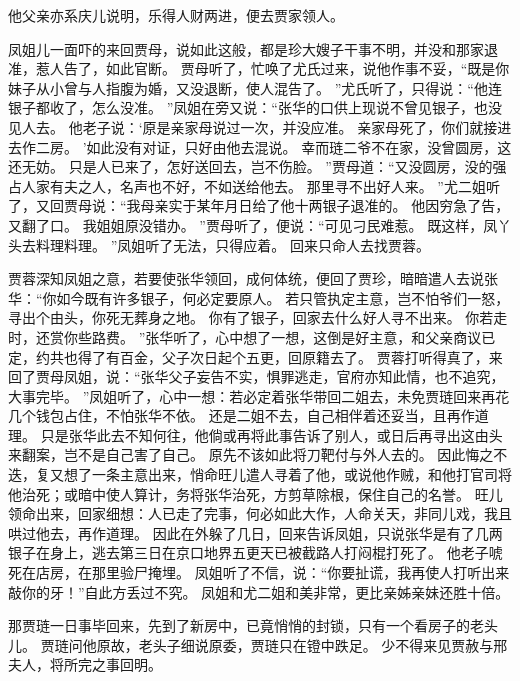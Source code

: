 他父亲亦系庆儿说明，乐得人财两进，便去贾家领人。
\par
凤姐儿一面吓的来回贾母，说如此这般，都是珍大嫂子干事不明，并没和那家退准，惹人告了，如此官断。
贾母听了，忙唤了尤氏过来，说他作事不妥，“既是你妹子从小曾与人指腹为婚，又没退断，使人混告了。
”尤氏听了，只得说：“他连银子都收了，怎么没准。
”凤姐在旁又说：“张华的口供上现说不曾见银子，也没见人去。
他老子说：‘原是亲家母说过一次，并没应准。
亲家母死了，你们就接进去作二房。
’如此没有对证，只好由他去混说。
幸而琏二爷不在家，没曾圆房，这还无妨。
只是人已来了，怎好送回去，岂不伤脸。
”贾母道：“又没圆房，没的强占人家有夫之人，名声也不好，不如送给他去。
那里寻不出好人来。
”尤二姐听了，又回贾母说：“我母亲实于某年月日给了他十两银子退准的。
他因穷急了告，又翻了口。
我姐姐原没错办。
”贾母听了，便说：“可见刁民难惹。
既这样，凤丫头去料理料理。
”凤姐听了无法，只得应着。
回来只命人去找贾蓉。
\par
贾蓉深知凤姐之意，若要使张华领回，成何体统，便回了贾珍，暗暗遣人去说张华：“你如今既有许多银子，何必定要原人。
若只管执定主意，岂不怕爷们一怒，寻出个由头，你死无葬身之地。
你有了银子，回家去什么好人寻不出来。
你若走时，还赏你些路费。
”张华听了，心中想了一想，这倒是好主意，和父亲商议已定，约共也得了有百金，父子次日起个五更，回原籍去了。
贾蓉打听得真了，来回了贾母凤姐，说：“张华父子妄告不实，惧罪逃走，官府亦知此情，也不追究，大事完毕。
”凤姐听了，心中一想：若必定着张华带回二姐去，未免贾琏回来再花几个钱包占住，不怕张华不依。
还是二姐不去，自己相伴着还妥当，且再作道理。
只是张华此去不知何往，他倘或再将此事告诉了别人，或日后再寻出这由头来翻案，岂不是自己害了自己。
原先不该如此将刀靶付与外人去的。
因此悔之不迭，复又想了一条主意出来，悄命旺儿遣人寻着了他，或说他作贼，和他打官司将他治死；或暗中使人算计，务将张华治死，方剪草除根，保住自己的名誉。
旺儿领命出来，回家细想：人已走了完事，何必如此大作，人命关天，非同儿戏，我且哄过他去，再作道理。
因此在外躲了几日，回来告诉凤姐，只说张华是有了几两银子在身上，逃去第三日在京口地界五更天已被截路人打闷棍打死了。
他老子唬死在店房，在那里验尸掩埋。
凤姐听了不信，说：“你要扯谎，我再使人打听出来敲你的牙！”自此方丢过不究。
凤姐和尤二姐和美非常，更比亲姊亲妹还胜十倍。
\par
那贾琏一日事毕回来，先到了新房中，已竟悄悄的封锁，只有一个看房子的老头儿。
贾琏问他原故，老头子细说原委，贾琏只在镫中跌足。
少不得来见贾赦与邢夫人，将所完之事回明。
